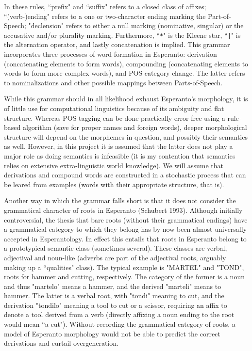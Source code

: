 \documentclass[10pt,a4paper]{article}
\begin{document}
In these rules, ``prefix" and ``suffix" refers to a closed class of affixes;
``(verb-)ending" refers to a one or two-character ending marking the
Part-of-Speech; "declension" refers to either a null marking (nominative,
singular) or the accusative and/or plurality marking. Furthermore,
``\texttt{*}" is the Kleene star, ``\texttt{|}" is the alternation operator,
and lastly concatenation is implied. This grammar incorporates three processes
of word-formation in Esperanto: derivation (concatenating elements to form
words), compounding (concatenating elements to words to form more complex
words), and POS category change.  The latter refers to nominalizations and
other possible mappings between Parts-of-Speech.

While this grammar should in all likelihood exhaust Esperanto's morphology, 
it is of little use for computational linguistics because of its ambiguity
and flat structure.  Whereas POS-tagging can be done practically error-free
using a rule-based algorithm (save for proper names and foreign words), deeper
morphological structure will depend on the morphemes in question, and possibly
their semantics as well. However, in this project it is assumed that the latter
does not play a major role as doing semantics is infeasible (it is my
contention that semantics relies on extensive extra-linguistic world
knowledge). We will assume that derivations and compound words are constructed
in a stochastic process that can be leared from examples (words with their
appropriate structure, that is).

Another way in which the grammar falls short is that it does not consider the
grammatical character of roots in Esperanto (Schubert 1993). Although initially
controversial, the thesis that bare roots (without their grammatical endings)
have a  grammatical category to which they belong has by now been almost
universally accepted in Esperantology. In effect this entails that roots in
Esperanto belong to a prototypical semantic class (sometimes several).  These
classes are verbal, adjectival and noun-like (adverbs are part of the
adjectival roots, arguably making up a ``qualities" class). The
typical example is "MARTEL" and "TOND", roots for hammer and cutting,
respectively. The category of the former is a noun and thus "martelo" means a
hammer, and the derived "marteli" means to hammer. The latter is a verbal root, 
with "tondi" meaning to cut, and the derivation "tondilo" meaning a
tool to cut or a scissor, requiring an affix to denote a tool derived from a
verb (directly affixing a noun ending to the root would mean ``a cut"). Without
recording the grammatical category of roots, a model of Esperanto morphology
would not be able to predict the correct derivations and curtail overgeneration.
\end{document}
